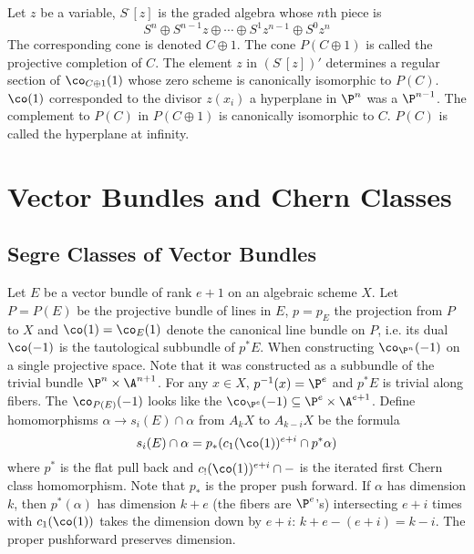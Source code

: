 Let $z$ be a variable, $S^\cdot[z]$ is the graded algebra whose $n$th piece is
	\[
	S^n \oplus S^{n-1}z \oplus \cdots \oplus S^1 z^{n-1} \oplus S^0 z^n
	\]
The corresponding cone is denoted $C\oplus 1$. The cone $P(C\oplus1)$ is called the projective completion of $C$. The element $z$ in $(S^\cdot[z])'$ determines a regular section of $\co_{C\oplus 1}(1)$ whose zero scheme is canonically isomorphic to $P(C)$. $\co(1)$ corresponded to the divisor $z(x_i)$ a hyperplane in $\P^n$ was a $\P^{n-1}$. The complement to $P(C)$ in $P(C\oplus 1)$ is canonically isomorphic to $C$. $P(C)$ is called the hyperplane at infinity. 




\section{Vector Bundles and Chern Classes}

\subsection{Segre Classes of Vector Bundles}

Let $E$ be a vector bundle of rank $e+1$ on an algebraic scheme $X$. Let $P=P(E)$ be the projective bundle of lines in $E$, $p=p_E$ the projection from $P$ to $X$ and $\co(1)=\co_E(1)$ denote the canonical line bundle on $P$, i.e. its dual $\co(-1)$ is the tautological subbundle of $p^*E$. When constructing $\co_{\P^n}(-1)$ on a single projective space. Note that it was constructed as a subbundle of the trivial bundle $\P^n \times \A^{n+1}$. For any $x \in X$, $p^{-1}(x)=\P^e$ and $p^*E$ is trivial along fibers. The $\co_{P(E)}(-1)$ looks like the $\co_{\P^e}(-1) \subseteq \P^e \times \A^{e+1}$. Define homomorphisms $\alpha \to s_i(E) \cap \alpha$ from $A_kX$ to $A_{k-i}X$ be the formula 
	\[
	s_i(E) \cap \alpha= p_*(c_1(\co(1))^{e+i} \cap p^*\alpha)
	\]
where $p^*$ is the flat pull back and $c_!(\co(1))^{e+i} \cap -$ is the iterated first Chern class homomorphism. Note that $p_*$ is the proper push forward. If $\alpha$ has dimension $k$, then $p^*(\alpha)$ has dimension $k+e$ (the fibers are $\P^e$'s) intersecting $e+i$ times with $c_1(\co(1))$ takes the dimension down by $e+i$: $k+e-(e+i)= k-i$. The proper pushforward preserves dimension.

